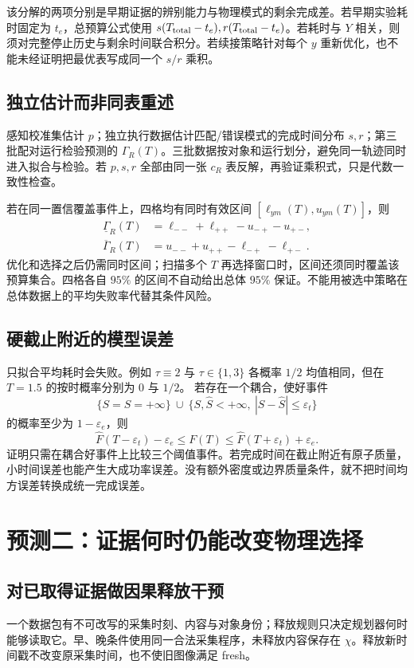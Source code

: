\documentclass[11pt,a4paper,fontset=fandol]{ctexart}
\theoremstyle{definition}
\theoremstyle{remark}
\numberwithin{equation}{section}
\begin{document}
该分解的两项分别是早期证据的辨别能力与物理模式的剩余完成差。若早期实验耗时固定为 $t_e$，总预算公式使用 $s(T_{\rm total}-t_e),r(T_{\rm total}-t_e)$。若耗时与 $Y$ 相关，则须对完整停止历史与剩余时间联合积分。若续接策略针对每个 $y$ 重新优化，也不能未经证明把最优表写成同一个 $s/r$ 乘积。

\subsection{独立估计而非同表重述}
感知校准集估计 $p$；独立执行数据估计匹配/错误模式的完成时间分布 $s,r$；第三批配对运行检验预测的 $\Gamma_R(T)$。三批数据按对象和运行划分，避免同一轨迹同时进入拟合与检验。若 $p,s,r$ 全部由同一张 $c_R$ 表反解，再验证乘积式，只是代数一致性检查。

若在同一置信覆盖事件上，四格均有同时有效区间 $[\ell_{ym}(T),u_{ym}(T)]$，则
\begin{align}
 \underline\Gamma_R(T)&=\ell_{--}+\ell_{++}-u_{-+}-u_{+-},\\
 \overline\Gamma_R(T)&=u_{--}+u_{++}-\ell_{-+}-\ell_{+-}.
 \label{eq:gamma-ci}
\end{align}
优化和选择之后仍需同时区间；扫描多个 $T$ 再选择窗口时，区间还须同时覆盖该预算集合。四格各自 $95\%$ 的区间不自动给出总体 $95\%$ 保证。不能用被选中策略在总体数据上的平均失败率代替其条件风险。

\subsection{硬截止附近的模型误差}
只拟合平均耗时会失败。例如 $\tau\equiv2$ 与 $\tau\in\{1,3\}$ 各概率 $1/2$ 均值相同，但在 $T=1.5$ 的按时概率分别为 $0$ 与 $1/2$。
若存在一个耦合，使好事件
\[
 \{S=\widehat S=+\infty\}\ \cup\
 \{S,\widehat S<+\infty,\ |S-\widehat S|\le\varepsilon_t\}
\]
的概率至少为 $1-\varepsilon_e$，则
\begin{equation}
 \widehat F(T-\varepsilon_t)-\varepsilon_e
 \le F(T)\le
 \widehat F(T+\varepsilon_t)+\varepsilon_e.
 \label{eq:time-bracket}
\end{equation}
证明只需在耦合好事件上比较三个阈值事件。若完成时间在截止附近有原子质量，小时间误差也能产生大成功率误差。没有额外密度或边界质量条件，就不把时间均方误差转换成统一完成误差。

\section{预测二：证据何时仍能改变物理选择}
\label{sec:timing}
\subsection{对已取得证据做因果释放干预}
一个数据包有不可改写的采集时刻、内容与对象身份；释放规则只决定规划器何时能够读取它。早、晚条件使用同一合法采集程序，未释放内容保存在 $\chi$。释放新时间戳不改变原采集时间，也不使旧图像满足 fresh。
\end{document}
